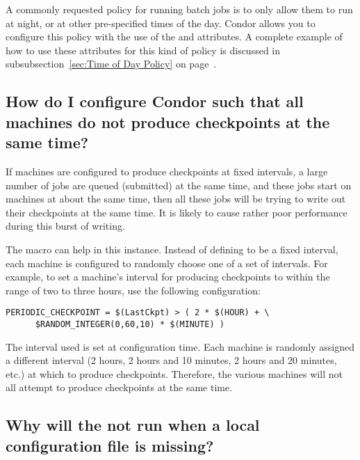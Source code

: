 A commonly requested policy for running batch jobs is to only allow
them to run at night, or at other pre-specified times of the day.
Condor allows you to configure this policy with the use of the
 and   attributes.  
A complete example of how to use these attributes for this kind of
policy is discussed in subsubsection~\ref{sec:Time of Day Policy} on
page~\pageref{sec:Time of Day Policy}.


\subsection*{How do I configure Condor such that all machines do not produce checkpoints at the same time?}
\label{sec:randomintegerusage}
If machines are configured to produce checkpoints at fixed intervals,
a large number of jobs are queued (submitted) at the same time,
and these jobs start on machines at about the same time,
then all these jobs will be trying to write out their checkpoints
at the same time.
It is likely to cause rather poor performance during this burst of
writing.

The  macro can help in this instance.
Instead of defining  to be a fixed
interval, each machine is configured to randomly choose 
one of a set of intervals.
For example, to set a machine's interval for producing checkpoints
to within the range of two to three hours, use the following
configuration:
\footnotesize
\begin{verbatim}
PERIODIC_CHECKPOINT = $(LastCkpt) > ( 2 * $(HOUR) + \
      $RANDOM_INTEGER(0,60,10) * $(MINUTE) )
\end{verbatim}
\normalsize

The interval used is set at configuration time.
Each machine is randomly assigned a different interval 
(2 hours, 2 hours and 10 minutes, 2 hours and 20 minutes, etc.)
at which to produce checkpoints.
Therefore, the various machines will not all attempt to
produce checkpoints at the same time.

\subsection*{Why will the  not run when a local configuration file is missing?}

